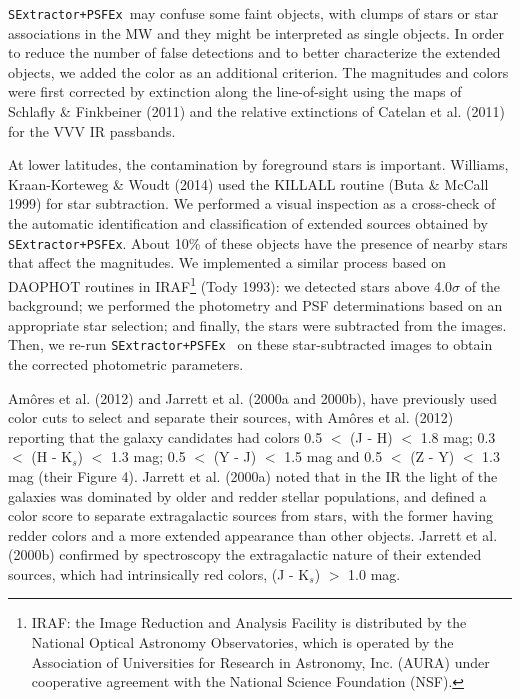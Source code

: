 \documentclass[preprint2]{aastex}
\newcommand{\dos}{{\tt SExtractor+PSFEx\ }}
\begin{document}
 \dos may confuse some faint objects, 
with  
clumps of stars or star associations in the MW and they might be interpreted
as single objects. In order to  reduce the number of
false detections and to better characterize the extended objects, we added
the color as
an additional criterion.  The magnitudes  and colors were first
corrected by extinction along the line-of-sight using
the maps of Schlafly \& Finkbeiner (2011) and the
relative extinctions  of Catelan et al. (2011) for the VVV IR passbands.

At lower latitudes, the contamination by foreground stars is important.
 Williams, Kraan-Korteweg \& Woudt (2014)
        used the KILLALL routine
        (Buta \& McCall 1999) for star subtraction.  We performed a visual inspection as a
cross-check of the automatic 
identification and classification of extended sources
obtained by {\tt SExtractor+PSFEx}.  About 10\% of these objects have
the presence of nearby stars that affect the magnitudes.
We implemented a similar process
  based on DAOPHOT routines in IRAF\footnote{IRAF: the Image Reduction and Analysis Facility is distributed by the National Optical Astronomy Observatories, which is operated by the Association of Universities for Research in Astronomy, Inc. (AURA) under cooperative agreement with the National Science Foundation (NSF).} (Tody 1993): we detected stars above 4.0$\sigma$ of the
  background; we performed the 
  photometry and PSF determinations based on an appropriate star selection;
  and finally, the stars were subtracted from the images.  Then, we re-run
  {\dos} on
  these star-subtracted images to obtain the corrected photometric parameters.

Am{\^o}res et al. (2012) and Jarrett et al. (2000a and 2000b), have previously
used color cuts to select and separate their sources, with 
Am{\^o}res et al. (2012) reporting that the galaxy
candidates had colors 0.5 $<$ (J - H) $<$ 1.8 mag;
0.3 $<$ (H - K$_s$) $<$ 1.3 mag; 0.5 $<$ (Y - J) $<$ 1.5 mag and
  0.5 $<$ (Z - Y) $<$ 1.3 mag (their Figure 4).
Jarrett et al. (2000a) noted that in the IR the light of the galaxies was
dominated by older and 
redder stellar populations, and defined a color score to separate 
extragalactic sources from stars, with the former having redder colors and a
more 
extended appearance than other objects.  Jarrett et al. (2000b) confirmed by
spectroscopy the extragalactic nature of their extended
sources, which had intrinsically red colors, (J - K$_s$) $>$ 1.0 mag.
\end{document}
